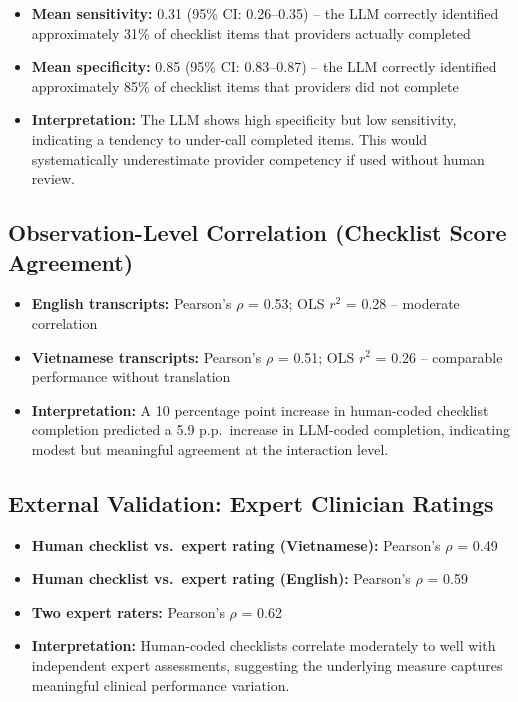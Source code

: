 \documentclass{article}
\begin{document}
\begin{itemize}

\item \textbf{Mean sensitivity:} 0.31 (95\% CI: 0.26--0.35) -- the LLM correctly identified approximately 31\% of checklist items that providers actually completed

\item \textbf{Mean specificity:} 0.85 (95\% CI: 0.83--0.87) -- the LLM correctly identified approximately 85\% of checklist items that providers did not complete

\item \textbf{Interpretation:} The LLM shows high specificity but low sensitivity, indicating a tendency to under-call completed items. This would systematically underestimate provider competency if used without human review.

\end{itemize}

\subsection*{Observation-Level Correlation (Checklist Score Agreement)}

\begin{itemize}

\item \textbf{English transcripts:} Pearson's $\rho$ = 0.53; OLS $r^{2}$ = 0.28 -- moderate correlation

\item \textbf{Vietnamese transcripts:} Pearson's $\rho$ = 0.51; OLS $r^{2}$ = 0.26 -- comparable performance without translation

\item \textbf{Interpretation:} A 10 percentage point increase in human-coded checklist completion predicted a 5.9 p.p.\ increase in LLM-coded completion, indicating modest but meaningful agreement at the interaction level.

\end{itemize}

\subsection*{External Validation: Expert Clinician Ratings}

\begin{itemize}

\item \textbf{Human checklist vs.\ expert rating (Vietnamese):} Pearson's $\rho$ = 0.49

\item \textbf{Human checklist vs.\ expert rating (English):} Pearson's $\rho$ = 0.59

\item \textbf{Two expert raters:} Pearson's $\rho$ = 0.62

\item \textbf{Interpretation:} Human-coded checklists correlate moderately to well with independent expert assessments, suggesting the underlying measure captures meaningful clinical performance variation.

\end{itemize}
\end{document}
